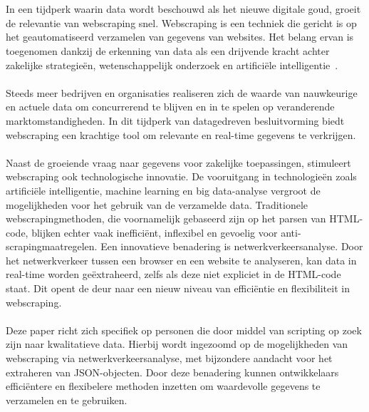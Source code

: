 
\chapter{}%
\label{ch:inleiding}
In een tijdperk waarin data wordt beschouwd als het nieuwe digitale goud, groeit de relevantie van webscraping snel. Webscraping is een techniek die gericht is op het geautomatiseerd verzamelen van gegevens van websites. Het belang ervan is toegenomen dankzij de erkenning van data als een drijvende kracht achter zakelijke strategieën, wetenschappelijk onderzoek en artificiële intelligentie~\autocite{RizaOeztuerk2023}.
\\ \\
Steeds meer bedrijven en organisaties realiseren zich de waarde van nauwkeurige en actuele data om concurrerend te blijven en in te spelen op veranderende marktomstandigheden. In dit tijdperk van datagedreven besluitvorming biedt webscraping een krachtige tool om relevante en real-time gegevens te verkrijgen.
\\ \\
Naast de groeiende vraag naar gegevens voor zakelijke toepassingen, stimuleert webscraping ook technologische innovatie. De vooruitgang in technologieën zoals artificiële intelligentie, machine learning en big data-analyse vergroot de mogelijkheden voor het gebruik van de verzamelde data. Traditionele webscrapingmethoden, die voornamelijk gebaseerd zijn op het parsen van HTML-code, blijken echter vaak inefficiënt, inflexibel en gevoelig voor anti-scrapingmaatregelen. Een innovatieve benadering is netwerkverkeersanalyse. Door het netwerkverkeer tussen een browser en een website te analyseren, kan data in real-time worden geëxtraheerd, zelfs als deze niet expliciet in de HTML-code staat. Dit opent de deur naar een nieuw niveau van efficiëntie en flexibiliteit in webscraping.
\\ \\
Deze paper richt zich specifiek op personen die door middel van scripting op zoek zijn naar kwalitatieve data. Hierbij wordt ingezoomd op de mogelijkheden van webscraping via netwerkverkeersanalyse, met bijzondere aandacht voor het extraheren van JSON-objecten. Door deze benadering kunnen ontwikkelaars efficiëntere en flexibelere methoden inzetten om waardevolle gegevens te verzamelen en te gebruiken.
